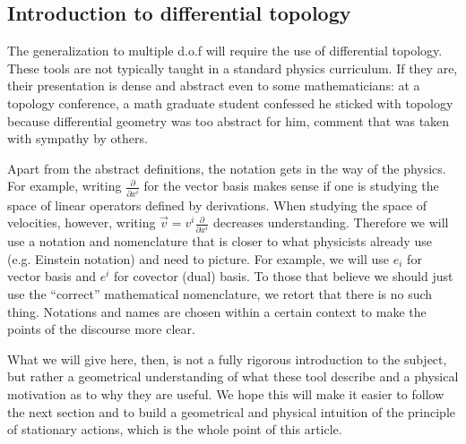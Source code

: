 \documentclass[10pt,twocolumn, nofootinbib]{revtex4-2}
\begin{document}
\subsection*{Introduction to differential topology}

The generalization to multiple d.o.f will require the use of differential topology. These tools are not typically taught in a standard physics curriculum. If they are, their presentation is dense and abstract even to some mathematicians: at a topology conference, a math graduate student confessed he sticked with topology because differential geometry was too abstract for him, comment that was taken with sympathy by others.

Apart from the abstract definitions, the notation gets in the way of the physics. For example, writing $\frac{\partial}{\partial x^i}$ for the vector basis makes sense if one is studying the space of linear operators defined by derivations. When studying the space of velocities, however, writing $\vec{v} = v^i\frac{\partial}{\partial x^i}$ decreases understanding. Therefore we will use a notation and nomenclature that is closer to what physicists already use (e.g. Einstein notation) and need to picture. For example, we will use $e_i$ for vector basis and $e^i$ for covector (dual) basis. To those that believe we should just use the ``correct'' mathematical nomenclature, we retort that there is no such thing. Notations and names are chosen within a certain context to make the points of the discourse more clear.

What we will give here, then, is not a fully rigorous introduction to the subject, but rather a geometrical understanding of what these tool describe and a physical motivation as to why they are useful. We hope this will make it easier to follow the next section and to build a geometrical and physical intuition of the principle of stationary actions, which is the whole point of this article.

\end{document}
